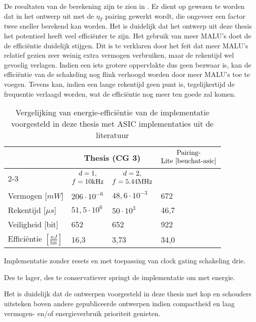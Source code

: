 De resultaten van de berekening zijn te zien in . Er dient op gewezen te worden dat in het ontwerp uit \cite{beuchat-asic} met de $\eta_T$ pairing gewerkt wordt, die ongeveer een factor twee sneller berekend kan worden. Het is duidelijk dat het ontwerp uit deze thesis het potentieel heeft veel effici\"enter te zijn. Het gebruik van meer MALU's doet de de effici\"entie duidelijk stijgen. Dit is te verklaren door het feit dat meer MALU's relatief gezien zeer weinig extra vermogen verbruiken, maar de rekentijd wel gevoelig verlagen. Indien een iets grotere oppervlakte dus geen bezwaar is, kan de effici\"entie van de schakeling nog flink verhoogd worden door meer MALU's toe te voegen. Tevens kan, indien een lange rekentijd geen punt is, tegelijkertijd de frequentie verlaagd worden, wat de effici\"entie nog meer ten goede zal komen. 

\begin{table}[h]
	\caption{Vergelijking van energie-effici\"entie van de implementatie voorgesteld in deze thesis met ASIC implementaties uit de literatuur}
	\label{tabel-resultaten-energie}

	\begin{narrow}{-2cm}{-2cm}
		\centering
		\begin{tabular}{llll}
			\toprule
			&	\multicolumn{2}{c}{Thesis (CG 3)\footnotemark[2]}	& \multirow{3}{*}{$\begin{array}{@{}c@{}}\text{Pairing-}\\\text{Lite \cite{beuchat-asic}}\end{array}$}\\
			\cmidrule(r){2-3}
			& \multicolumn{1}{c}{$\begin{array}{@{}c@{}}d = 1,\\f = 10\text{kHz}\end{array}$} & \multicolumn{1}{c}{$\begin{array}{@{}c@{}}d = 2,\\f = 5.44\text{MHz}\end{array}$} &\\
	 		\midrule
			Vermogen [$mW$]																& $206 \cdot 10^{-6}$		& $48,6 \cdot 10^{-3}$		& 672\\
			Rekentijd [$\mu s$]															& $51,5 \cdot 10^6$			& $50 \cdot 10^3$				& 46,7\\
			Veiligheid [bit]																& 652								& 652								& 922\\
			Effici\"entie $\left[ \frac{nJ}{\text{bit}}\right]$\footnotemark[3]	& 16,3					& 3,73							& 34,0\\
			\bottomrule		
		\end{tabular}
	\end{narrow}
		
	\footnotesize \footnotemark[2] Implementatie zonder resets en met toepassing van clock gating schakeling drie.
	
	\footnotemark[3] Des te lager, des te conservatiever springt de implementatie om met energie.
\end{table}

Het is duidelijk dat de ontwerpen voorgesteld in deze thesis met kop en schouders uitsteken boven andere gepubliceerde ontwerpen indien compactheid en laag vermogen- en/of energieverbruik prioriteit genieten.
